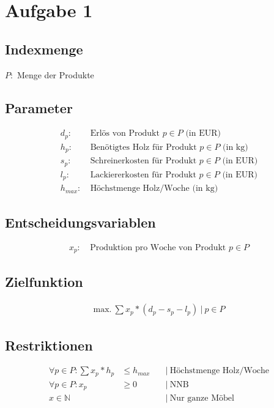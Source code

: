 \documentclass[a4paper,11pt]{article}
\begin{document}
\raggedright %

\section*{Aufgabe 1}

\subsection*{Indexmenge}

$P:$ Menge der Produkte \\

\subsection*{Parameter}

\begin{align*}
  d_p :&~ \text{Erlös von Produkt $p \in P$ (in EUR)} \\
  h_p :&~ \text{Benötigtes Holz für Produkt $p \in P$ (in kg)} \\
  s_p :&~ \text{Schreinerkosten für Produkt $p \in P$ (in EUR)} \\
  l_p :&~ \text{Lackiererkosten für Produkt $p \in P$ (in EUR)} \\
  h_{max} :&~ \text{Höchstmenge Holz/Woche (in kg)}
\end{align*}

\subsection*{Entscheidungsvariablen}

\begin{align*}
  x_p :&~ \text{Produktion pro Woche von Produkt $p \in P$}
\end{align*}

\subsection*{Zielfunktion}

\begin{align*}
  \text{max.} ~ \sum x_p * (d_p - s_p - l_p) ~|~ p \in P
\end{align*}

\subsection*{Restriktionen}

\begin{align*}
  \forall p \in P : \sum x_p * h_p &\le h_{max} &&~\big|~ \text{Höchstmenge Holz/Woche} \\
  \forall p \in P : x_p &\ge 0 &&~\big|~ \text{NNB} \\
  x \in \mathbb{N} &&&~\big|~ \text{Nur ganze Möbel}
\end{align*}
\end{document}
